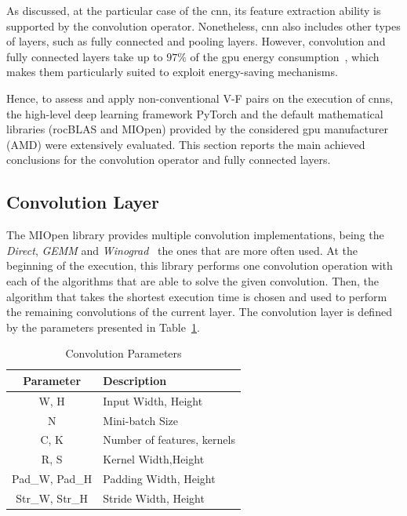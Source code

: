 As discussed, at the particular case of the \acrshort{cnn}, its feature extraction ability is supported by the convolution operator. Nonetheless, \acrshort{cnn} also includes other types of layers, such as fully connected and pooling layers. However, convolution and fully connected layers take up to $97\%$ of the \acrshort{gpu} energy consumption~\cite{li_evaluating_2016}, which makes them particularly suited to exploit energy-saving mechanisms. 

Hence, to assess and apply non-conventional V-F pairs on the execution of \acrshort{cnn}s, the high-level deep learning framework PyTorch and the default mathematical libraries (rocBLAS and MIOpen) provided by the considered \acrshort{gpu} manufacturer (AMD) were extensively evaluated. This section reports the main achieved conclusions for the convolution operator and fully connected layers.

\subsection{Convolution Layer}

The MIOpen library provides multiple convolution implementations, being the \textit{Direct}, \textit{GEMM} and \textit{Winograd}~\cite{khan_miopen_2019} the ones that are more often used. 
At the beginning of the execution, this library performs one convolution operation with each of the algorithms that are able to solve the given convolution. Then, the algorithm that takes the shortest execution time is chosen and used to perform the remaining convolutions of the current layer. The convolution layer is defined by the parameters presented in Table~\ref{tab:convparams}. 

\begin{table}[htbp]
\caption{Convolution Parameters}
\begin{center}
\begin{tabular}{cl}
\hline
\textbf{Parameter}&\textbf{Description} \\ 
\hline
W, H & Input Width, Height\\
N & Mini-batch Size \\
C, K & Number of features, kernels \\
R, S & Kernel Width,Height\\
Pad\_W, Pad\_H & Padding Width, Height \\
Str\_W, Str\_H & Stride Width, Height \\
\hline
\end{tabular}
\label{tab:convparams}
\end{center}
\end{table}

